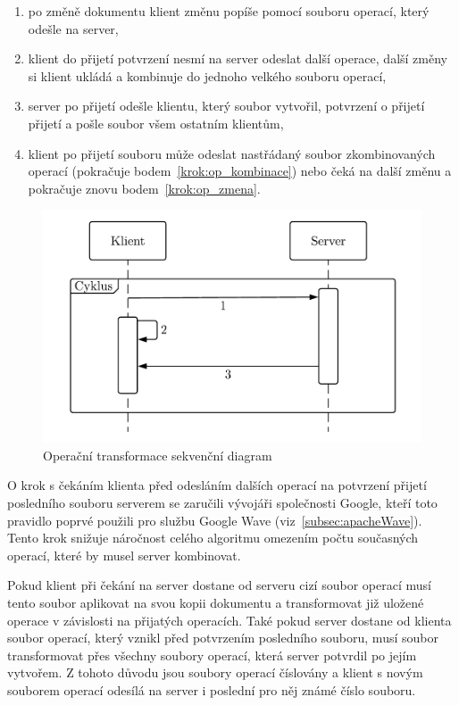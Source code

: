 \begin{enumerate}
    \item po změně dokumentu klient změnu popíše pomocí souboru operací, který odešle na server,\label{krok:op_zmena}
    \item klient do přijetí potvrzení nesmí na server odeslat další operace, další změny si klient ukládá a kombinuje do jednoho velkého souboru operací,\label{krok:op_kombinace}
    \item server po přijetí odešle klientu, který soubor vytvořil, potvrzení o přijetí přijetí a pošle soubor všem ostatním klientům,
    \item klient po přijetí souboru může odeslat nastřádaný soubor zkombinovaných operací (pokračuje bodem~\ref{krok:op_kombinace}) nebo čeká na další změnu a pokračuje znovu bodem~\ref{krok:op_zmena}.~\cite{ot:waveAddition}
\end{enumerate}

\begin{figure}[ht]
    \centering
    \includegraphics[width=\textwidth]{partials/analyza/OP_diagram.pdf}
    \caption{Operační transformace sekvenční diagram}\label{fig:OP_diagram}
\end{figure}

O krok s čekáním klienta před odesláním dalších operací na potvrzení přijetí posledního souboru serverem se zaručili vývojáři společnosti Google, kteří toto pravidlo poprvé použili pro službu Google Wave (viz~\ref{subsec:apacheWave}).
Tento krok snižuje náročnost celého algoritmu omezením počtu současných operací, které by musel server kombinovat.~\cite{ot:waveAddition}

Pokud klient při čekání na server dostane od serveru cizí soubor operací musí tento soubor aplikovat na svou kopii dokumentu a transformovat již uložené operace v závislosti na přijatých operacích.
Také pokud server dostane od klienta soubor operací, který vznikl před potvrzením posledního souboru, musí soubor transformovat přes všechny soubory operací, která server potvrdil po jejím vytvořem.
Z tohoto důvodu jsou soubory operací číslovány a klient s novým souborem operací odesílá na server i poslední pro něj známé číslo souboru.

